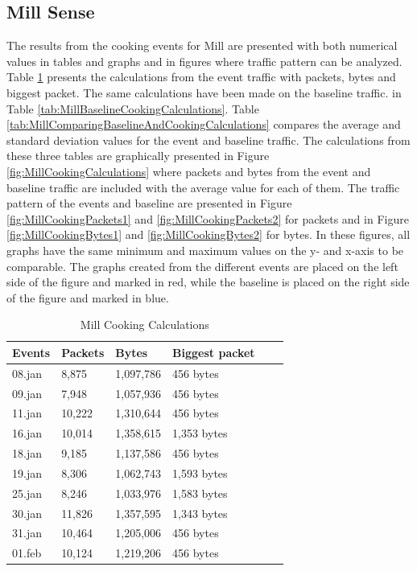 \newpage
\subsection{Mill Sense}
The results from the cooking events for Mill are presented with both numerical values in tables and graphs and in figures where traffic pattern can be analyzed. Table \ref{tab:MillCookingCalculations} presents the calculations from the event traffic with packets, bytes and biggest packet. The same calculations have been made on the baseline traffic. in Table \ref{tab:MillBaselineCookingCalculations}. Table \ref{tab:MillComparingBaselineAndCookingCalculations} compares the average and standard deviation values for the event and baseline traffic. The calculations from these three tables are graphically presented in Figure \ref{fig:MillCookingCalculations} where packets and bytes from the event and baseline traffic are included with the average value for each of them. The traffic pattern of the events and baseline are presented in Figure \ref{fig:MillCookingPackets1} and \ref{fig:MillCookingPackets2} for packets and in Figure \ref{fig:MillCookingBytes1} and \ref{fig:MillCookingBytes2} for bytes. In these figures, all graphs have the same minimum and maximum values on the y- and x-axis to be comparable. The graphs created from the different events are placed on the left side of the figure and marked in red, while the baseline is placed on the right side of the figure and marked in blue. 

\begin{table}[H]
    \centering
    \caption{Mill Cooking Calculations}
    \begin{tabular}{|l|l|l|l|l|l|}
    \hline
        \textbf{Events} & \textbf{Packets} & \textbf{Bytes} & \textbf{Biggest packet} \\ \hline
        08.jan & 8,875  & 1,097,786 & 456 bytes   \\ \hline
        09.jan & 7,948  & 1,057,936 & 456 bytes   \\ \hline
        11.jan & 10,222 & 1,310,644 & 456 bytes   \\ \hline
        16.jan & 10,014 & 1,358,615 & 1,353 bytes \\ \hline
        18.jan & 9,185  & 1,137,586 & 456 bytes   \\ \hline
        19.jan & 8,306  & 1,062,743 & 1,593 bytes \\ \hline
        25.jan & 8,246  & 1,033,976 & 1,583 bytes \\ \hline
        30.jan & 11,826 & 1,357,595 & 1,343 bytes  \\ \hline
        31.jan & 10,464 & 1,205,006 & 456 bytes \\ \hline
        01.feb & 10,124 & 1,219,206 & 456 bytes \\ \hline
    \end{tabular}
    \label{tab:MillCookingCalculations}
\end{table}

